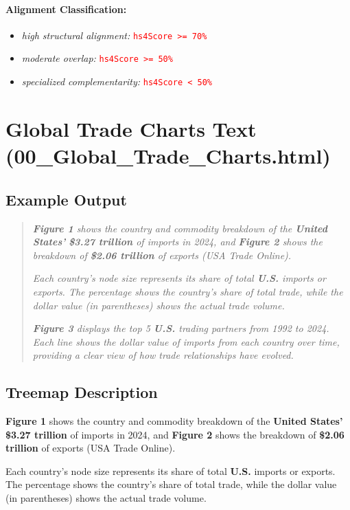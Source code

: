 \documentclass[12pt]{article}
\newcommand{\bold}[1]{\textbf{#1}}
\newcommand{\cond}[1]{\textcolor{red}{\texttt{#1}}}
\begin{document}
\paragraph{Alignment Classification:}
\begin{itemize}[noitemsep]
\item \textit{high structural alignment:} \cond{hs4Score >= 70\%}
\item \textit{moderate overlap:} \cond{hs4Score >= 50\%}
\item \textit{specialized complementarity:} \cond{hs4Score < 50\%}
\end{itemize}

\section{Global Trade Charts Text (00\_Global\_Trade\_Charts.html)}

\subsection{Example Output}
\begin{quote}
\textit{\textbf{Figure 1} shows the country and commodity breakdown of the \textbf{United States'} \textbf{\$3.27 trillion} of imports in 2024, and \textbf{Figure 2} shows the breakdown of \textbf{\$2.06 trillion} of exports (USA Trade Online).}

\textit{Each country's node size represents its share of total \textbf{U.S.} imports or exports. The percentage shows the country's share of total trade, while the dollar value (in parentheses) shows the actual trade volume.}

\textit{\textbf{Figure 3} displays the top 5 \textbf{U.S.} trading partners from 1992 to 2024. Each line shows the dollar value of imports from each country over time, providing a clear view of how trade relationships have evolved.}
\end{quote}

\subsection{Treemap Description}
\bold{Figure 1} shows the country and commodity breakdown of the \bold{United States'} \bold{\$3.27 trillion} of imports in 2024, and \bold{Figure 2} shows the breakdown of \bold{\$2.06 trillion} of exports (USA Trade Online).

Each country's node size represents its share of total \bold{U.S.} imports or exports. The percentage shows the country's share of total trade, while the dollar value (in parentheses) shows the actual trade volume.
\end{document}
